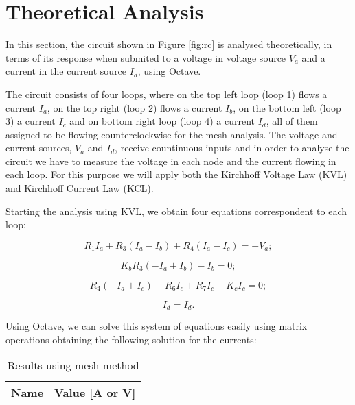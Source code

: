 \section{Theoretical Analysis}
\label{sec:analysis}

In this section, the circuit shown in Figure \ref{fig:rc} is analysed
theoretically, in terms of its response when submited to a voltage in
voltage source $V_a$ and a current in the current source $I_d$, using
Octave.

The circuit consists of four loops, where on the top left loop (loop 1) flows a current $I_a$,
on the top right (loop 2) flows a current $I_b$, on the bottom left (loop 3) a current $I_c$
and on bottom right loop (loop 4) a current $I_d$, all of them assigned to be flowing counterclockwise for
the mesh analysis. The voltage and current sources, $V_a$ and $I_d$, receive countinuous inputs and in order to analyse the circuit
we have to measure the voltage in each node and the current flowing in each loop.
For this purpose we will apply both the Kirchhoff Voltage Law (KVL) and Kirchhoff
Current Law (KCL). \par
Starting the analysis using KVL, we obtain four equations correspondent to each loop:

\begin{equation}
  R_1I_a + R_3(I_a - I_b) + R_4(I_a - I_c) = -V_a ;
  \label{eq:kvl1}
\end{equation}

\begin{equation}
  K_bR_3(-I_a + I_b) - I_b = 0;
  \label{eq:kvl2}
\end{equation}

\begin{equation}
  R_4(-I_a + I_c) + R_6I_c + R_7I_c - K_cI_c = 0;
  \label{eq:kvl3}
\end{equation}

\begin{equation}
  I_d = I_d.
  \label{eq:kvl4}
\end{equation}

\vspace{0.2cm}

Using Octave, we can solve this system of equations easily using matrix operations obtaining the following
solution for the currents:

\begin{table}[h]
  \centering
  \begin{tabular}{|l|r|}
    \hline    
    {\bf Name} & {\bf Value [A or V]} \\ \hline
    
  \end{tabular}
  \caption{Results using mesh method}
  \label{tab:tabela1}
\end{table}

